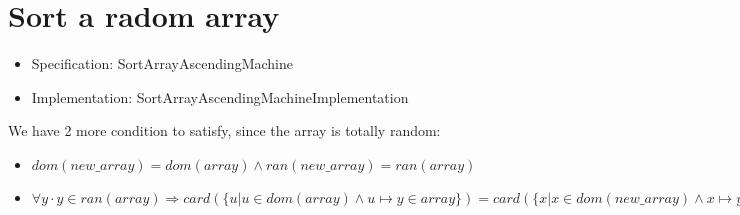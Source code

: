 \section{Sort a radom array}

\begin{itemize}
\item Specification: SortArrayAscendingMachine
\item Implementation: SortArrayAscendingMachineImplementation
\end{itemize}

We have 2 more condition to satisfy, since the array is totally random: 
\begin{itemize}
\item $dom(new\_array) = dom(array) \land ran(new\_array) = ran(array)$
\item $\forall y \cdot y \in ran(array) \Rightarrow card(\{u | u \in dom(array) \land u \mapsto y \in array\}) = card(\{x | x \in dom(new\_array) \land x \mapsto y \in new_array\})$
\end{itemize}